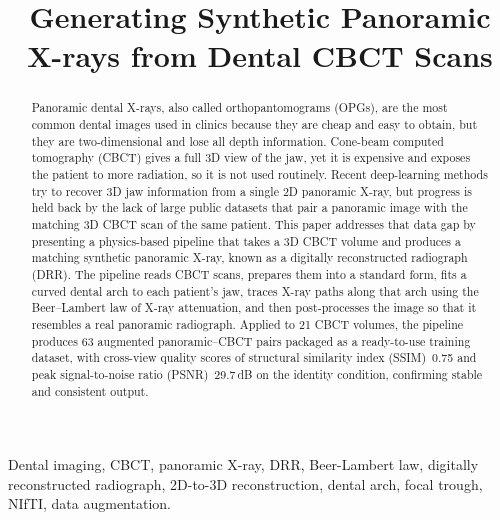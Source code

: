 \documentclass[conference]{IEEEtran}
\begin{document}
\title{Generating Synthetic Panoramic X-rays from Dental CBCT Scans}

\author{
}

\maketitle

\begin{abstract}
Panoramic dental X-rays, also called orthopantomograms (OPGs), are the most common dental images used in clinics because they are cheap and easy to obtain, but they are two-dimensional and lose all depth information. Cone-beam computed tomography (CBCT) gives a full 3D view of the jaw, yet it is expensive and exposes the patient to more radiation, so it is not used routinely. Recent deep-learning methods try to recover 3D jaw information from a single 2D panoramic X-ray, but progress is held back by the lack of large public datasets that pair a panoramic image with the matching 3D CBCT scan of the same patient. This paper addresses that data gap by presenting a physics-based pipeline that takes a 3D CBCT volume and produces a matching synthetic panoramic X-ray, known as a digitally reconstructed radiograph (DRR). The pipeline reads CBCT scans, prepares them into a standard form, fits a curved dental arch to each patient's jaw, traces X-ray paths along that arch using the Beer--Lambert law of X-ray attenuation, and then post-processes the image so that it resembles a real panoramic radiograph. Applied to 21 CBCT volumes, the pipeline produces 63 augmented panoramic--CBCT pairs packaged as a ready-to-use training dataset, with cross-view quality scores of structural similarity index (SSIM)~0.75 and peak signal-to-noise ratio (PSNR)~29.7\,dB on the identity condition, confirming stable and consistent output.
\end{abstract}

\begin{IEEEkeywords}
Dental imaging, CBCT, panoramic X-ray, DRR, Beer-Lambert law, digitally reconstructed radiograph, 2D-to-3D reconstruction, dental arch, focal trough, NIfTI, data augmentation.
\end{IEEEkeywords}
\end{document}
